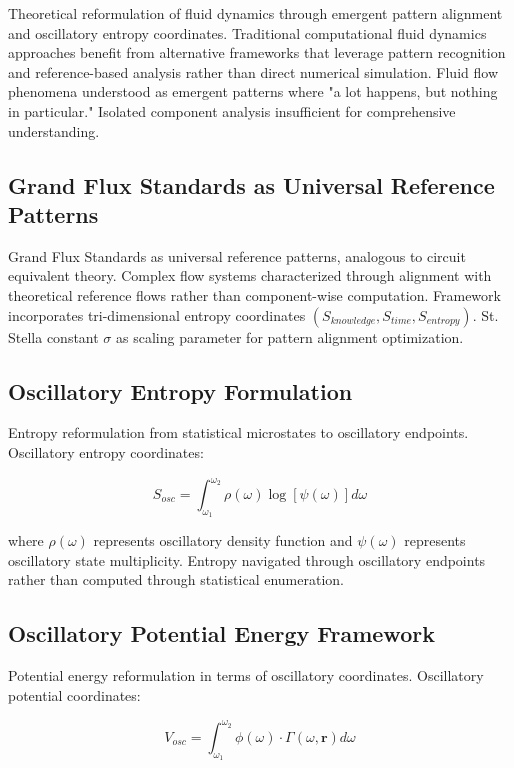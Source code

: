 \documentclass[12pt,a4paper]{article}
\begin{document}
Theoretical reformulation of fluid dynamics through emergent pattern alignment and oscillatory entropy coordinates. Traditional computational fluid dynamics approaches benefit from alternative frameworks that leverage pattern recognition and reference-based analysis rather than direct numerical simulation. Fluid flow phenomena understood as emergent patterns where "a lot happens, but nothing in particular." Isolated component analysis insufficient for comprehensive understanding.

\subsection{Grand Flux Standards as Universal Reference Patterns}

Grand Flux Standards as universal reference patterns, analogous to circuit equivalent theory. Complex flow systems characterized through alignment with theoretical reference flows rather than component-wise computation. Framework incorporates tri-dimensional entropy coordinates $(S_{knowledge}, S_{time}, S_{entropy})$. St. Stella constant $\sigma$ as scaling parameter for pattern alignment optimization.

\subsection{Oscillatory Entropy Formulation}

Entropy reformulation from statistical microstates to oscillatory endpoints. Oscillatory entropy coordinates:

\begin{equation}
S_{osc} = \int_{\omega_1}^{\omega_2} \rho(\omega) \log[\psi(\omega)] d\omega
\end{equation}

where $\rho(\omega)$ represents oscillatory density function and $\psi(\omega)$ represents oscillatory state multiplicity. Entropy navigated through oscillatory endpoints rather than computed through statistical enumeration.

\subsection{Oscillatory Potential Energy Framework}

Potential energy reformulation in terms of oscillatory coordinates. Oscillatory potential coordinates:

\begin{equation}
V_{osc} = \int_{\omega_1}^{\omega_2} \phi(\omega) \cdot \Gamma(\omega, \mathbf{r}) d\omega
\end{equation}
\end{document}
